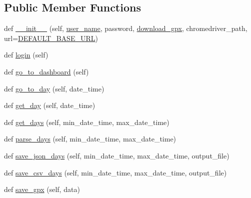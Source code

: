 \subsection*{Public Member Functions}
\begin{DoxyCompactItemize}
\item 
def \hyperlink{classpygce_1_1models_1_1bot_1_1_garmin_connect_bot_aeb909c53e6a647b5e8419d4877ba5b6d}{\+\_\+\+\_\+init\+\_\+\+\_\+} (self, \hyperlink{classpygce_1_1models_1_1bot_1_1_garmin_connect_bot_a259da08c172fe9b54bbb6b997ab840a7}{user\+\_\+name}, password, \hyperlink{classpygce_1_1models_1_1bot_1_1_garmin_connect_bot_a81b2ce5ff74592aeb9b1d8ebc236bfe4}{download\+\_\+gpx}, chromedriver\+\_\+path, url=\hyperlink{classpygce_1_1models_1_1bot_1_1_garmin_connect_bot_a860621296516b8e3793321d0773e30f3}{D\+E\+F\+A\+U\+L\+T\+\_\+\+B\+A\+S\+E\+\_\+\+U\+RL})
\item 
def \hyperlink{classpygce_1_1models_1_1bot_1_1_garmin_connect_bot_a31c8153cff1e4c2ce2a66d3b3aada3f1}{login} (self)
\item 
def \hyperlink{classpygce_1_1models_1_1bot_1_1_garmin_connect_bot_ad9433580f9aced25b650ddd5e912cc52}{go\+\_\+to\+\_\+dashboard} (self)
\item 
def \hyperlink{classpygce_1_1models_1_1bot_1_1_garmin_connect_bot_a3a0df451b2e7c0667064adc5c0ba1ad5}{go\+\_\+to\+\_\+day} (self, date\+\_\+time)
\item 
def \hyperlink{classpygce_1_1models_1_1bot_1_1_garmin_connect_bot_ab5ab1e855230273b7c7c085a461a3ed2}{get\+\_\+day} (self, date\+\_\+time)
\item 
def \hyperlink{classpygce_1_1models_1_1bot_1_1_garmin_connect_bot_a18ab2d80266a9da67186bcba6b4856b9}{get\+\_\+days} (self, min\+\_\+date\+\_\+time, max\+\_\+date\+\_\+time)
\item 
def \hyperlink{classpygce_1_1models_1_1bot_1_1_garmin_connect_bot_a17c3b23e3a712395581e88294308b822}{parse\+\_\+days} (self, min\+\_\+date\+\_\+time, max\+\_\+date\+\_\+time)
\item 
def \hyperlink{classpygce_1_1models_1_1bot_1_1_garmin_connect_bot_a6b7760e4013e2ada06bed1a5f47133f1}{save\+\_\+json\+\_\+days} (self, min\+\_\+date\+\_\+time, max\+\_\+date\+\_\+time, output\+\_\+file)
\item 
def \hyperlink{classpygce_1_1models_1_1bot_1_1_garmin_connect_bot_ac10284acc765724afd060381ace0cb5e}{save\+\_\+csv\+\_\+days} (self, min\+\_\+date\+\_\+time, max\+\_\+date\+\_\+time, output\+\_\+file)
\item 
def \hyperlink{classpygce_1_1models_1_1bot_1_1_garmin_connect_bot_a9cd831d6a4a8efdd793a395f99fc1796}{save\+\_\+gpx} (self, data)
\end{DoxyCompactItemize}
